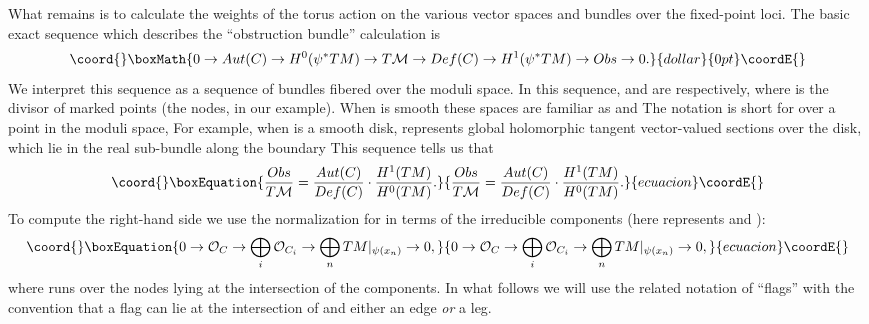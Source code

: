 \documentclass[a4paper,11pt]{article}
\begin{document}
What remains is to calculate the weights of the
torus action on the various vector spaces and bundles
over the fixed-point loci.
The basic exact sequence
which describes the ``obstruction bundle''
calculation is
$$\coord{}\boxMath{0\rightarrow
Aut(C)\rightarrow H^0(\psi^*TM)\rightarrow T{\cal M}\rightarrow
Def(C)\rightarrow H^1(\psi^*TM)\rightarrow Obs\rightarrow 0.}{dollar}{0pt}\coordE{}$$
We interpret this sequence as a sequence of bundles
fibered over the moduli space.
In this sequence, \coordHE{} and \coordHE{}
are \coordHE{}  \coordHE{} respectively, where \coordHE{} is the
divisor of marked points (the nodes, in our example). 
When \coordHE{} is smooth these spaces are familiar as
\coordHE{} and \coordHE{}  The notation \coordHE{}  \coordHE{} is short for \coordHE{}
over a point \coordHE{} in
the moduli space, \coordHE{}
For example, when \coordHE{} is a smooth disk, \coordHE{}
represents global holomorphic tangent vector-valued
sections over the disk, which lie in the real
sub-bundle \coordHE{} along the boundary \coordHE{}
This sequence tells us that
\begin{equation}\coord{}\boxEquation{
\label{numden}
\frac{Obs}{T{\cal M}} =
\frac{Aut(C)}{Def(C)}\cdot \frac{H^1(TM)}
{H^0(TM)}.
}{
\frac{Obs}{T{\cal M}} =
\frac{Aut(C)}{Def(C)}\cdot \frac{H^1(TM)}
{H^0(TM)}.
}{ecuacion}\coordE{}\end{equation}
To compute the right-hand side we use the normalization
for \coordHE{} in terms of the irreducible components \coordHE{}
(here \coordHE{} represents \coordHE{}  \coordHE{} and \coordHE{}):
\begin{equation}\coord{}\boxEquation{
\label{normseq}0\rightarrow {\cal O}_C\rightarrow
\bigoplus_{i}{\cal O}_{C_i}\rightarrow
\bigoplus_n{TM|_{\psi(x_n)}}
\rightarrow 0,
}{
0\rightarrow {\cal O}_C\rightarrow
\bigoplus_{i}{\cal O}_{C_i}\rightarrow
\bigoplus_n{TM|_{\psi(x_n)}}
\rightarrow 0,
}{ecuacion}\coordE{}\end{equation}
where \coordHE{} runs over the nodes \coordHE{} lying at the
intersection of the components.  In what follows
we will use
the related notation of ``flags'' \coordHE{} with the
convention that a flag can lie at the intersection of
\coordHE{} and either an edge {\em or} a leg.
\end{document}
